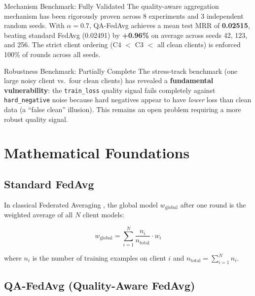 \documentclass[12pt,a4paper]{article}
\begin{document}
\begin{successbox}{Mechanism Benchmark: Fully Validated}
  The quality-aware aggregation mechanism has been rigorously proven across 8 experiments and 3 independent random seeds. With $\alpha=0.7$, QA-FedAvg achieves a mean test MRR of \textbf{0.02515}, beating standard FedAvg (0.02491) by \textbf{+0.96\%} on average across seeds 42, 123, and 256. The strict client ordering (C4 $<$ C3 $<$ all clean clients) is enforced 100\% of rounds across all seeds.
\end{successbox}

\begin{warnbox}{Robustness Benchmark: Partially Complete}
  The stress-track benchmark (one large noisy client vs.\ four clean clients) has revealed a \textbf{fundamental vulnerability}: the \texttt{train\_loss} quality signal fails completely against \texttt{hard\_negative} noise because hard negatives appear to have \textit{lower} loss than clean data (a ``false clean'' illusion). This remains an open problem requiring a more robust quality signal.
\end{warnbox}

\section{Mathematical Foundations}

\subsection{Standard FedAvg}

In classical Federated Averaging \cite{mcmahan2017}, the global model $w_{\text{global}}$ after one round is the weighted average of all $N$ client models:

\begin{equation}
  w_{\text{global}} = \sum_{i=1}^{N} \frac{n_i}{n_{\text{total}}} \cdot w_i
  \label{eq:fedavg}
\end{equation}

where $n_i$ is the number of training examples on client $i$ and $n_{\text{total}} = \sum_{i=1}^N n_i$.

\subsection{QA-FedAvg (Quality-Aware FedAvg)}
\end{document}
